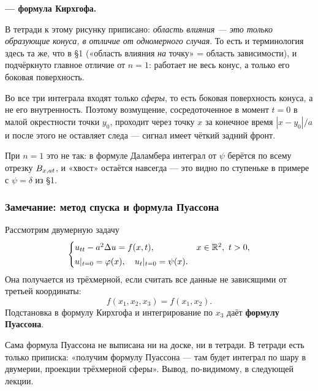 \begin{center}
\textbf{— формула Кирхгофа.}
\end{center}


\begin{remark}
В тетради к этому рисунку приписано: \emph{область влияния — это только
образующие конуса, в отличие от одномерного случая}. То есть и терминология
здесь та же, что в \S1 («область влияния \emph{на} точку» = область
зависимости), и подчёркнуто главное отличие от $n=1$: работает не весь конус,
а только его боковая поверхность.
\end{remark}

\begin{idea}[title={Принцип Гюйгенса}]
Во все три интеграла входят только \emph{сферы}, то есть боковая поверхность
конуса, а не его внутренность. Поэтому возмущение, сосредоточенное в момент
$t=0$ в малой окрестности точки $y_0$, проходит через точку $x$ за конечное
время $|x-y_0|/a$ и после этого не оставляет следа — сигнал имеет чёткий задний
фронт.

\medskip
При $n=1$ это не так: в формуле Даламбера интеграл от $\psi$ берётся по всему
отрезку $B_{x,at}$, и «хвост» остаётся навсегда — это видно по ступеньке в
примере с $\psi = \delta$ из \S1.
\end{idea}

\subsubsection*{Замечание: метод спуска и формула Пуассона}

\begin{remark}
Рассмотрим двумерную задачу
\[
  \begin{cases}
    u_{tt} - a^2 \Delta u = f(x,t), & x \in \mathbb{R}^2,\ t > 0, \\[2pt]
    u|_{t=0} = \varphi(x), \quad u_t|_{t=0} = \psi(x) .
  \end{cases}
\]
Она получается из трёхмерной, если считать все данные не зависящими от третьей
координаты:
\[
  f(x_1,x_2,x_3) = f(x_1,x_2) .
\]
Подстановка в формулу Кирхгофа и интегрирование по $x_3$ даёт \textbf{формулу
Пуассона}.
\end{remark}

\begin{warn}
Сама формула Пуассона не выписана ни на доске, ни в тетради. В тетради есть
только приписка: «получим формулу Пуассона — там будет интеграл по шару в
двумерии, проекции трёхмерной сферы». Вывод, по-видимому, в следующей лекции.
\end{warn}

